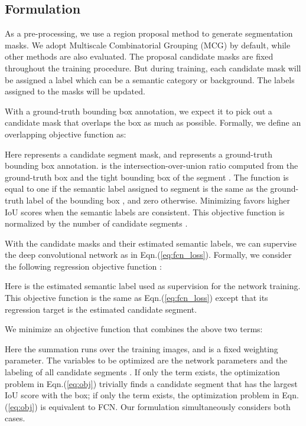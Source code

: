 \documentclass[10pt,twocolumn,letterpaper]{article}
\begin{document}
\subsection{Formulation}

As a pre-processing, we use a region proposal method to generate segmentation masks. We adopt Multiscale Combinatorial Grouping (MCG) \cite{arbelaez2014multiscale} by default, while other methods \cite{uijlings2013selective,krahenbuhl2014geodesic} are also evaluated. The proposal candidate masks are fixed throughout the training procedure. But during training, each candidate mask will be assigned a label which can be a semantic category or background. The labels assigned to the masks will be updated.

With a ground-truth bounding box annotation, we expect it to pick out a candidate mask that overlaps the box as much as possible. Formally, we define an overlapping objective function  as:

Here  represents a candidate segment mask, and  represents a ground-truth bounding box annotation.  is the intersection-over-union ratio computed from the ground-truth box  and the tight bounding box of the segment . The function  is equal to one if the semantic label  assigned to segment  is the same as the ground-truth label  of the bounding box , and zero otherwise. Minimizing  favors higher IoU scores when the semantic labels are consistent. This objective function is normalized by the number of candidate segments .

With the candidate masks and their estimated semantic labels, we can supervise the deep convolutional network as in Eqn.(\ref{eq:fcn_loss}). Formally, we consider the following regression objective function :

Here  is the estimated semantic label used as supervision for the network training. This objective function is the same as Eqn.(\ref{eq:fcn_loss}) except that its regression target is the estimated candidate segment.

We minimize an objective function that combines the above two terms:

Here the summation  runs over the training images, and  is a fixed weighting parameter. The variables to be optimized are the network parameters  and the labeling  of all candidate segments . If only the term  exists, the optimization problem in Eqn.(\ref{eq:obj}) trivially finds a candidate segment that has the largest IoU score with the box; if only the term  exists, the optimization problem in Eqn.(\ref{eq:obj}) is equivalent to FCN. Our formulation simultaneously considers both cases.
\end{document}
